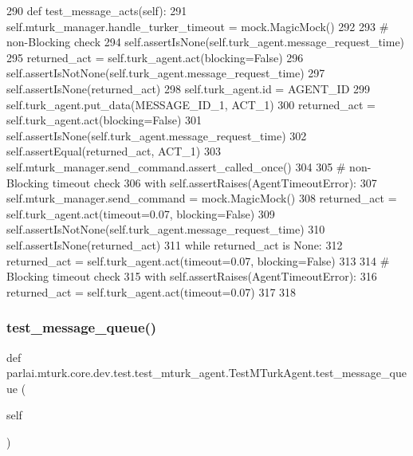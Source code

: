 \begin{DoxyCode}
290     \textcolor{keyword}{def }test\_message\_acts(self):
291         self.mturk\_manager.handle\_turker\_timeout = mock.MagicMock()
292 
293         \textcolor{comment}{# non-Blocking check}
294         self.assertIsNone(self.turk\_agent.message\_request\_time)
295         returned\_act = self.turk\_agent.act(blocking=\textcolor{keyword}{False})
296         self.assertIsNotNone(self.turk\_agent.message\_request\_time)
297         self.assertIsNone(returned\_act)
298         self.turk\_agent.id = AGENT\_ID
299         self.turk\_agent.put\_data(MESSAGE\_ID\_1, ACT\_1)
300         returned\_act = self.turk\_agent.act(blocking=\textcolor{keyword}{False})
301         self.assertIsNone(self.turk\_agent.message\_request\_time)
302         self.assertEqual(returned\_act, ACT\_1)
303         self.mturk\_manager.send\_command.assert\_called\_once()
304 
305         \textcolor{comment}{# non-Blocking timeout check}
306         with self.assertRaises(AgentTimeoutError):
307             self.mturk\_manager.send\_command = mock.MagicMock()
308             returned\_act = self.turk\_agent.act(timeout=0.07, blocking=\textcolor{keyword}{False})
309             self.assertIsNotNone(self.turk\_agent.message\_request\_time)
310             self.assertIsNone(returned\_act)
311             \textcolor{keywordflow}{while} returned\_act \textcolor{keywordflow}{is} \textcolor{keywordtype}{None}:
312                 returned\_act = self.turk\_agent.act(timeout=0.07, blocking=\textcolor{keyword}{False})
313 
314         \textcolor{comment}{# Blocking timeout check}
315         with self.assertRaises(AgentTimeoutError):
316             returned\_act = self.turk\_agent.act(timeout=0.07)
317 
318 
\end{DoxyCode}
\mbox{\label{classparlai_1_1mturk_1_1core_1_1dev_1_1test_1_1test__mturk__agent_1_1TestMTurkAgent_a2b8a45bfee86cdd9e2a5ae10905b6334}} 
\subsubsection{\texorpdfstring{test\+\_\+message\+\_\+queue()}{test\_message\_queue()}}
{\footnotesize\ttfamily def parlai.\+mturk.\+core.\+dev.\+test.\+test\+\_\+mturk\+\_\+agent.\+Test\+M\+Turk\+Agent.\+test\+\_\+message\+\_\+queue (\begin{DoxyParamCaption}\item[{}]{self }\end{DoxyParamCaption})}

